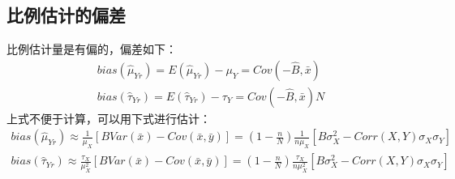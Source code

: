 \subsection{比例估计的偏差}
\begin{theorem}
	比例估计量是有偏的，偏差如下：
	\begin{gather*}
		bias(\hat{\mu}_{Yr})=E(\hat{\mu}_{Yr})-\mu_Y=Cov(-\hat{B},\bar{x}) \\
		bias(\hat{\tau}_{Yr})=E(\hat{\tau}_{Yr})-\tau_Y=Cov(-\hat{B},\bar{x})N
	\end{gather*}
	上式不便于计算，可以用下式进行估计：
	\begin{gather*}
		bias(\hat{\mu}_{Yr})\approx\frac{1}{\mu_X}\left[BVar(\bar{x})-Cov(\bar{x},\bar{y})\right]=\left(1-\frac{n}{N}\right)\frac{1}{n\mu_X}[B\sigma_X^2-Corr(X,Y)\sigma_X\sigma_Y] \\
		bias(\hat{\tau}_{Yr})\approx\frac{\tau_X}{\mu_X^2}\left[BVar(\bar{x})-Cov(\bar{x},\bar{y})\right]=\left(1-\frac{n}{N}\right)\frac{\tau_X}{n\mu_X^2}[B\sigma_X^2-Corr(X,Y)\sigma_X\sigma_Y]
	\end{gather*}
\end{theorem}
